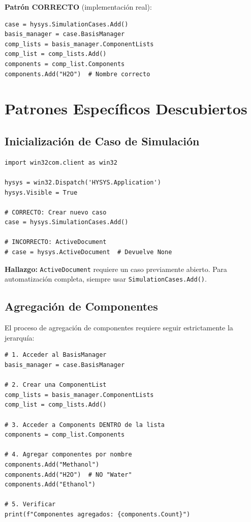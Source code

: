 \documentclass[12pt,a4paper]{article}
\begin{document}
\begin{successbox}
\textbf{Patrón CORRECTO} (implementación real):
\begin{lstlisting}
case = hysys.SimulationCases.Add()
basis_manager = case.BasisManager
comp_lists = basis_manager.ComponentLists
comp_list = comp_lists.Add()
components = comp_list.Components
components.Add("H2O")  # Nombre correcto
\end{lstlisting}
\end{successbox}

\section{Patrones Específicos Descubiertos}

\subsection{Inicialización de Caso de Simulación}

\begin{lstlisting}
import win32com.client as win32

hysys = win32.Dispatch('HYSYS.Application')
hysys.Visible = True

# CORRECTO: Crear nuevo caso
case = hysys.SimulationCases.Add()

# INCORRECTO: ActiveDocument
# case = hysys.ActiveDocument  # Devuelve None
\end{lstlisting}

\begin{infobox}
\textbf{Hallazgo:} \texttt{ActiveDocument} requiere un caso previamente abierto. Para automatización completa, siempre usar \texttt{SimulationCases.Add()}.
\end{infobox}

\subsection{Agregación de Componentes}

El proceso de agregación de componentes requiere seguir estrictamente la jerarquía:

\begin{lstlisting}
# 1. Acceder al BasisManager
basis_manager = case.BasisManager

# 2. Crear una ComponentList
comp_lists = basis_manager.ComponentLists
comp_list = comp_lists.Add()

# 3. Acceder a Components DENTRO de la lista
components = comp_list.Components

# 4. Agregar componentes por nombre
components.Add("Methanol")
components.Add("H2O")  # NO "Water"
components.Add("Ethanol")

# 5. Verificar
print(f"Componentes agregados: {components.Count}")
\end{lstlisting}
\end{document}
